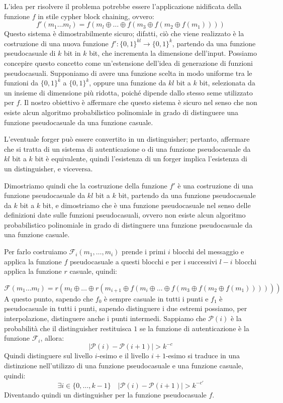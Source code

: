 L'idea per risolvere il problema potrebbe essere l'applicazione nidificata della funzione $f$
in stile cypher block chaining, ovvero:
\[
  f'(m_1\dots m_l) =   f(m_l \oplus \dots \oplus f(m_3 \oplus f(m_2 \oplus f(m_1))))
\]
Questo sistema è dimostrabilmente sicuro; difatti, ciò che viene realizzato è
la costruzione di una nuova funzione $f' : \{0, 1\}^{kl} \to \{0, 1\}^k$, partendo
da una funzione pseudocasuale di $k$ bit in $k$ bit, che incrementa la dimensione dell'input.
Possiamo concepire questo concetto come un'estensione dell'idea di generazione di funzioni pseudocasuali.
Supponiamo di avere una funzione scelta in modo uniforme tra le funzioni da $\{0, 1\}^k$ a $\{0, 1\}^k$,
oppure una funzione da $kl$ bit a $k$ bit, selezionata da un insieme di dimensione più ridotta, poiché
dipende dallo stesso seme utilizzato per $f$. Il nostro obiettivo è affermare che questo sistema è
sicuro nel senso che non esiste alcun algoritmo probabilistico polinomiale in grado di distinguere
una funzione pseudocasuale da una funzione casuale.

L'eventuale forger può essere convertito in un distinguisher; pertanto, affermare che si tratta
di un sistema di autenticazione o di una funzione pseudocasuale da $kl$ bit a $k$ bit è equivalente, 
quindi l'esistenza di un forger implica l'esistenza di un distinguisher, e viceversa.

Dimostriamo quindi che la costruzione della funzione $f'$ è una costruzione di una funzione pseudocasuale
da $kl$ bit a $k$ bit, partendo da una funzione pseudocasuale da $k$ bit a $k$ bit, e dimostriamo che è
una funzione pseudocasuale nel senso delle definizioni date sulle funzioni pseudocasuali, ovvero 
non esiste alcun algoritmo probabilistico polinomiale in grado di distinguere una funzione pseudocasuale
da una funzione casuale.

Per farlo costruiamo $\mathcal{F}_i (m_1, \dots, m_i)$ prende i primi $i$ blocchi del messaggio e applica 
la funzione $f$ pseudocasuale a questi blocchi e per i successivi $l - i$ blocchi applica la funzione
$r$ casuale, quindi:

\[
  \mathcal{F}(m_1\dots m_l) =   r(m_l \oplus \dots \oplus r(m_{i+1} \oplus f(m_i \oplus \dots \oplus f(m_3 \oplus
  f(m_2 \oplus f(m_1))))))
\]
A questo punto, sapendo che $f_0$ è sempre casuale in tutti i punti e $f_1$ è pseudocasuale in tutti i punti, 
sapendo distinguere i due estremi possiamo, per interpolazione, distinguere anche i punti intermedi.
Sappiamo che $\mathcal{P}(i)$ è la probabilità che il distinguisher restituisca $1$ se la funzione 
di autenticazione è la funzione $\mathcal{F}_i$, allora:
\[
  \big| \mathcal{P}(i) - \mathcal{P}(i+1) \big| > k^{-c}
\]
Quindi distinguere sul livello $i$-esimo e il livello $i+1$-esimo si traduce in una distinzione
nell'utilizzo di una funzione pseudocasuale e una funzione casuale, quindi:
\[
  \exists i \in \{0, \dots, k-1\} \quad \big| \mathcal{P}(i) - \mathcal{P}(i+1) \big| > k^{-c'}
\]
Diventando quindi un distinguisher per la funzione pseudocasuale $f$.
